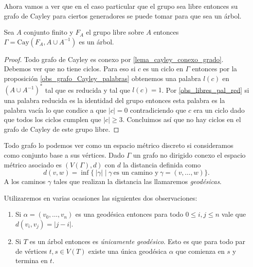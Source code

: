 \documentclass[tesis.tex]{subfiles}
\begin{document}
Ahora vamos a ver que en el caso particular que el grupo sea libre entonces su grafo de Cayley para ciertos generadores se puede tomar para que sea un árbol.

\begin{lema}\label{lema_cayley_libre_arbol}
	Sea $A$ conjunto finito y $F_{A}$ el grupo libre sobre $A$ entonces $\Gamma = \text{Cay}(F_{A},A \cup A^{-1})$ es un árbol.
\end{lema}

\begin{proof}
	Todo grafo de Cayley es conexo por \ref{lema_cayley_conexo_grado}.
	Debemos ver que no tiene ciclos.
	Para eso si $c$ es un ciclo en $\Gamma$ entonces por la proposición \ref{obs_grafo_Cayley_palabras} obtenemos una palabra $l(c)$ en $(A \cup A^{-1})^*$ tal que es {reducida} y tal que $l(c) = 1$.
	Por \ref{obs_libres_pal_red} si una palabra reducida es la identidad del grupo entonces esta palabra es la palabra vacía lo que condice a que $|c|=0$ contradiciendo que $c$ era un ciclo dado que todos los ciclos cumplen que $|c| \ge 3$.
	Concluimos así que no hay ciclos en el grafo de Cayley de este grupo libre.
	
\end{proof}


Todo grafo lo podemos ver como un espacio métrico discreto si consideramos como conjunto base a sus vértices. 
Dado $\Gamma$ un grafo no dirigido conexo el espacio métrico asociado es 
$ (V(\Gamma), d )$ con $d$ la distancia definida como 
\[
	d(v,w) = \inf \{ \  |\gamma|  \mid  \gamma \ \text{es un camino y} \ 
	\gamma=(v,\dots, w)  \}.
\] 
A los caminos $\gamma$ tales que realizan la distancia las llamaremos \emph{geodésicas}.

Utilizaremos en varias ocasiones las siguientes dos observaciones:

\begin{enumerate}[1-]
	\item Si $\alpha = (v_{0}, \dots, v_{n})$ es una geodésica entonces para todo $0 \le i,j \le n$ vale que  $d(v_{i}, v_{j}) = |j-i|$.
	\item Si $T$ es un árbol entonces es \emph{únicamente geodésico}.
	Esto es que para todo par de vértices $t,s \in V(T)$ existe una única geodésica $\alpha$ que comienza en $s$ y termina en $t$.
\end{enumerate}
\end{document}
